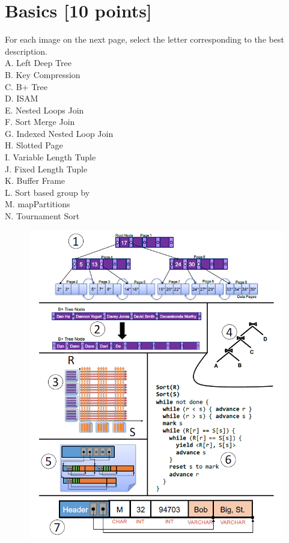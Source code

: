 \documentclass[10pt]{article}
\begin{document}


\section{Basics \textbf{[10 points]}}
For each image on the next page, select the letter corresponding to the best description. \\
A. Left Deep Tree \\
B. Key Compression \\
C. B+ Tree \\
D. ISAM \\
E. Nested Loops Join \\
F. Sort Merge Join \\
G. Indexed Nested Loop Join \\
H. Slotted Page \\
I. Variable Length Tuple \\
J. Fixed Length Tuple \\
K. Buffer Frame \\
L. Sort based group by \\
M. mapPartitions \\
N. Tournament Sort \\
\begin{figure}
	\centering
	\includegraphics[width=.9\linewidth]{basics.png}
\end{figure}
\end{document}
